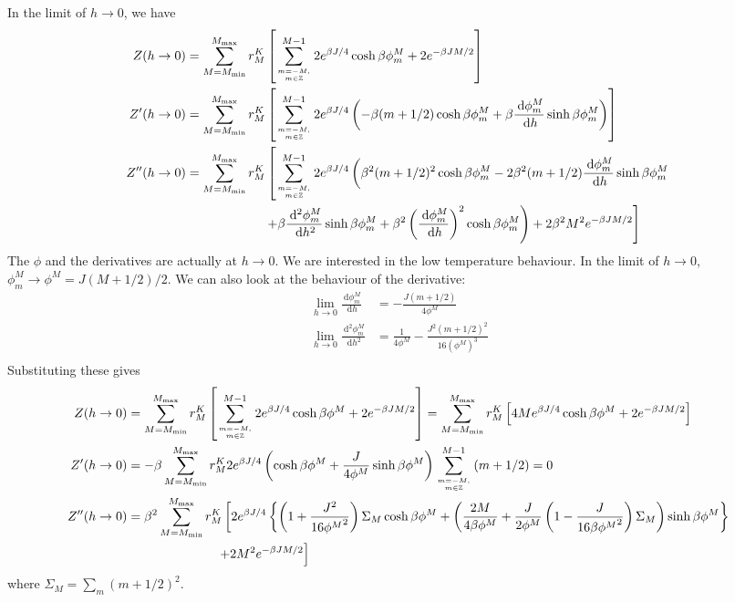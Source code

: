 \documentclass[12pt]{revtex4-2}
\begin{document}
In the limit of \(h \to 0\), we  have
\begin{align}
	     Z(h \to 0) &=\sum_{M=M_\text{min}}^{M_\text{max}}r^K_M\left[\sum_{m=-M, \atop{m\in \mathbb{Z}}}^{M-1}2e^{\beta J/4}\cosh \beta\phi^M_m + 2e^{-\beta JM/2}\right]\\
	Z^\prime(h \to 0) &=\sum_{M=M_\text{min}}^{M_\text{max}}r^K_M\left[\sum_{m=-M, \atop{m\in \mathbb{Z}}}^{M-1}2e^{\beta J/4}\left(-\beta (m+1/2) \cosh \beta\phi^M_m + \beta\frac{\:\mathrm{d}\phi^M_m}{\:\mathrm{d}h}\sinh \beta\phi^M_m\right)\right]\\
	Z^{\prime\prime}(h \to 0) &=\sum_{M=M_\text{min}}^{M_\text{max}}r^K_M\left[\sum_{m=-M, \atop{m\in \mathbb{Z}}}^{M-1}2 e^{\beta J/4}\left(\beta^2 (m+1/2)^2 \cosh \beta\phi^M_m - 2\beta^2 (m+1/2)\frac{\:\mathrm{d}\phi^M_m}{\:\mathrm{d}h}\sinh \beta\phi^M_m\right.\right.\\
			    &\quad\quad\quad\quad\quad\quad\left.\left. + \beta\frac{\:\mathrm{d^2}\phi^M_m}{\:\mathrm{d}h^2}\sinh \beta\phi^M_m + \beta^2\left(\frac{\:\mathrm{d}\phi^M_m}{\:\mathrm{d}h}\right)^2 \cosh \beta\phi^M_m\right) + 2\beta^2 M^2 e^{-\beta JM/2}\right]\\
\end{align}
The \(\phi\) and the derivatives are actually at \(h\to 0\). We are interested in the low temperature behaviour. In the limit of \(h \to 0\), \(\phi_m^M \to \phi^M = J(M+1/2)/2\). We can also look at the behaviour of the derivative:
\begin{align}
	\lim_{h \to 0}\frac{\:\mathrm{d}\phi_m^M}{\:\mathrm{d}h} &= -\frac{J(m+1/2)}{4\phi^M}\\
	\lim_{h \to 0}\frac{\:\mathrm{d}^2\phi_m^M}{\:\mathrm{d}h^2} &= \frac{1}{4\phi^M} - \frac{J^2(m + 1/2)^2}{16\left(\phi^M\right)^3}\\
\end{align}
Substituting these gives
\begin{align}
	     Z(h \to 0) &=\sum_{M=M_\text{min}}^{M_\text{max}}r^K_M\left[\sum_{m=-M, \atop{m\in \mathbb{Z}}}^{M-1}2e^{\beta J/4}\cosh \beta\phi^M + 2e^{-\beta JM/2}\right] = \sum_{M=M_\text{min}}^{M_\text{max}}r^K_M\left[4Me^{\beta J/4}\cosh \beta\phi^M + 2e^{-\beta JM/2}\right]\\
	Z^\prime(h \to 0) &=-\beta\sum_{M=M_\text{min}}^{M_\text{max}}r^K_M2e^{\beta J/4} \left(\cosh \beta\phi^M + \frac{J}{4\phi^M}\sinh \beta\phi^M\right)\sum_{m=-M, \atop{m\in \mathbb{Z}}}^{M-1}\left( m + 1/2 \right) = 0\\
Z^{\prime\prime}(h \to 0) &=\beta^2\sum_{M=M_\text{min}}^{M_\text{max}}r^K_M\left[2 e^{\beta J/4}\left\{\left(1 + \frac{J^2}{16{\phi^M}^2}\right) \Sigma_M \cosh \beta\phi^M + \left(\frac{2M}{4\beta\phi^M} + \frac{J}{2\phi^M}\left(1 - \frac{J}{16\beta{\phi^M}^2}\right)\Sigma_M \right) \sinh \beta\phi^M\right\} \right.\\
			  &\quad\quad\quad\quad\quad\quad\quad\left.+ 2 M^2 e^{-\beta JM/2}\right]\\
\end{align}
where \(\Sigma_M = \sum_m (m+1/2)^2\).
\end{document}
